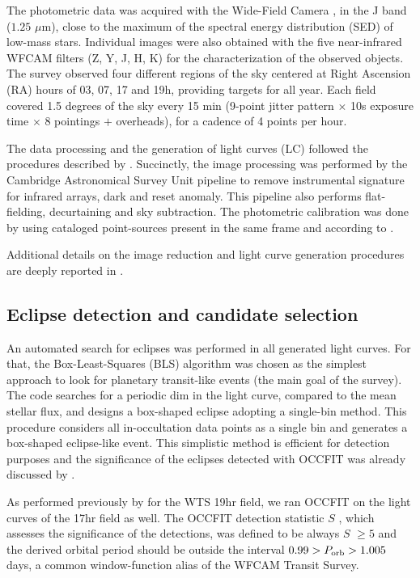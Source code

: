 \documentclass[fleqn,usenatbib]{mnras}
\begin{document}
The photometric data was acquired with the Wide-Field Camera \citep[WFCAM, ][]{Hodgkin09}, in the J band ($1.25$ $\mu$m), close to the maximum of the spectral energy distribution (SED) of low-mass stars. Individual images were also obtained with the five near-infrared WFCAM filters (Z, Y, J, H, K) for the characterization of the observed objects.
The survey observed four different regions of the sky centered at Right Ascension (RA) hours of 03, 07, 17 and 19h, providing targets for all year. Each field covered 1.5 degrees of the sky every 15 min (9-point jitter pattern $\times$ 10s exposure time $\times$ 8 pointings $+$ overheads), for a cadence of 4 points per hour.

The data processing and the generation of light curves (LC) followed the procedures described by \citet{Irwin09}. Succinctly, the image processing was performed by the Cambridge Astronomical Survey Unit pipeline to remove instrumental signature for infrared arrays, dark and reset anomaly. This pipeline also performs flat-fielding, decurtaining and sky subtraction. The photometric calibration was done by using cataloged point-sources present in the same frame and according to \citet{Hodgkin09}.

Additional details on the image reduction and light curve generation procedures are deeply reported in \citet[][and references therein]{Kovacs13}.


\subsection{Eclipse detection and candidate selection}

An automated search for eclipses was performed in all generated light curves. For that, the Box-Least-Squares (BLS) algorithm \citep[OCCFIT, ][]{Aigrain04} was chosen as the simplest approach to look for planetary transit-like events (the main goal of the survey). The code searches for a periodic dim in the light curve, compared to the mean stellar flux, and designs a box-shaped eclipse adopting a single-bin method. This procedure considers all in-occultation data points as a single bin and generates a box-shaped eclipse-like event. This simplistic method is efficient for detection purposes \citep{Birkby12,Birkby14} and the significance of the eclipses detected with OCCFIT was already discussed by \citet[][and references therein]{Miller08}.

As performed previously by \citet{Birkby12} for the WTS 19hr field, we ran OCCFIT on the light curves of the 17hr field as well. The OCCFIT detection statistic {$S$} \citep[see ][for more details]{Pont06}, which assesses the significance of the detections, was defined to be always $S$ $\geq 5$ and the derived orbital period should be outside the interval $0.99 > P_{\rm orb} > 1.005$ days, a common window-function alias of the WFCAM Transit Survey.
\end{document}
